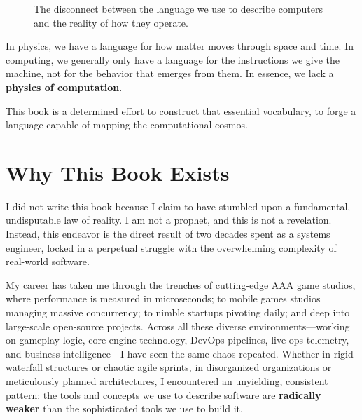 \begin{figure}[h]
    \centering
    \caption{The disconnect between the language we use to describe computers and the reality of how they operate.}
    \label{fig:surface_vs_reality}
\end{figure}

In physics, we have a language for how matter moves through space and time. In computing, we generally only have a language for the instructions we give the machine, not for the behavior that emerges from them. In essence, we lack a \textbf{physics of computation}.

This book is a determined effort to construct that essential vocabulary, to forge a language capable of mapping the computational cosmos.

\section{Why This Book Exists}
\label{sec:why-exists}

I did not write this book because I claim to have stumbled upon a fundamental, undisputable law of reality. I am not a prophet, and this is not a revelation. Instead, this endeavor is the direct result of two decades spent as a systems engineer, locked in a perpetual struggle with the overwhelming complexity of real-world software. 

My career has taken me through the trenches of cutting-edge AAA game studios, where performance is measured in microseconds; to mobile games studios managing massive concurrency; to nimble startups pivoting daily; and deep into large-scale open-source projects. Across all these diverse environments—working on gameplay logic, core engine technology, DevOps pipelines, live-ops telemetry, and business intelligence—I have seen the same chaos repeated. Whether in rigid waterfall structures or chaotic agile sprints, in disorganized organizations or meticulously planned architectures, I encountered an unyielding, consistent pattern: the tools and concepts we use to describe software are \textbf{radically weaker} than the sophisticated tools we use to build it.

